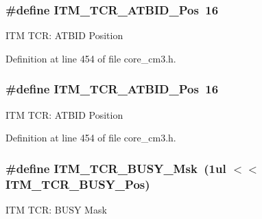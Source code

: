 \subsubsection[{\texorpdfstring{I\+T\+M\+\_\+\+T\+C\+R\+\_\+\+A\+T\+B\+I\+D\+\_\+\+Pos}{ITM_TCR_ATBID_Pos}}]{\setlength{\rightskip}{0pt plus 5cm}\#define I\+T\+M\+\_\+\+T\+C\+R\+\_\+\+A\+T\+B\+I\+D\+\_\+\+Pos~16}\hypertarget{group___c_m_s_i_s___c_m3___i_t_m_gad5a179af7ad1f2b8958e50907186529b}{}\label{group___c_m_s_i_s___c_m3___i_t_m_gad5a179af7ad1f2b8958e50907186529b}
I\+TM T\+CR\+: A\+T\+B\+ID Position 

Definition at line 454 of file core\+\_\+cm3.\+h.

\subsubsection[{\texorpdfstring{I\+T\+M\+\_\+\+T\+C\+R\+\_\+\+A\+T\+B\+I\+D\+\_\+\+Pos}{ITM_TCR_ATBID_Pos}}]{\setlength{\rightskip}{0pt plus 5cm}\#define I\+T\+M\+\_\+\+T\+C\+R\+\_\+\+A\+T\+B\+I\+D\+\_\+\+Pos~16}\hypertarget{group___c_m_s_i_s___c_m3___i_t_m_gad5a179af7ad1f2b8958e50907186529b}{}\label{group___c_m_s_i_s___c_m3___i_t_m_gad5a179af7ad1f2b8958e50907186529b}
I\+TM T\+CR\+: A\+T\+B\+ID Position 

Definition at line 454 of file core\+\_\+cm3.\+h.

\subsubsection[{\texorpdfstring{I\+T\+M\+\_\+\+T\+C\+R\+\_\+\+B\+U\+S\+Y\+\_\+\+Msk}{ITM_TCR_BUSY_Msk}}]{\setlength{\rightskip}{0pt plus 5cm}\#define I\+T\+M\+\_\+\+T\+C\+R\+\_\+\+B\+U\+S\+Y\+\_\+\+Msk~(1ul $<$$<$ I\+T\+M\+\_\+\+T\+C\+R\+\_\+\+B\+U\+S\+Y\+\_\+\+Pos)}\hypertarget{group___c_m_s_i_s___c_m3___i_t_m_ga43ad7cf33de12f2ef3a412d4f354c60f}{}\label{group___c_m_s_i_s___c_m3___i_t_m_ga43ad7cf33de12f2ef3a412d4f354c60f}
I\+TM T\+CR\+: B\+U\+SY Mask 

